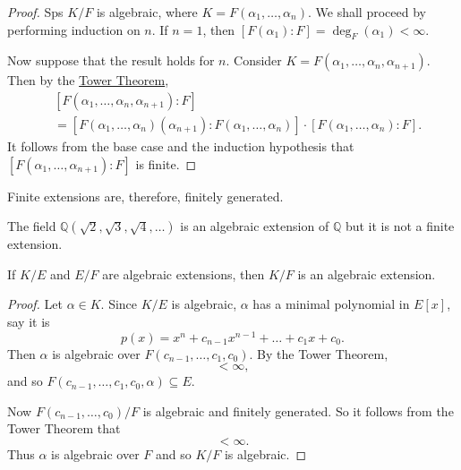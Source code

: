 \documentclass[notoc,notitlepage]{tufte-book}
\begin{document}
\begin{proof}
  Sps $K / F$ is algebraic, where $K = F(\alpha_1, \ldots, \alpha_n)$. We shall proceed by performing
  induction on $n$. If $n = 1$, then $[F(\alpha_1) : F] = \deg_F(\alpha_1) < \infty$.

  Now suppose that the result holds for $n$. Consider $K = F(\alpha_1, \ldots, \alpha_n, \alpha_{n + 1})$.
  Then by the \hyperref[thm:tower_theorem]{Tower Theorem},
  \begin{align*}
    &[F(\alpha_1, \ldots, \alpha_n, \alpha_{n + 1}) : F] \\
    &= [F(\alpha_1, \ldots, \alpha_{n})(\alpha_{n + 1}) : F(\alpha_1, \ldots, \alpha_n)]
        \cdot [F(\alpha_1, \ldots, \alpha_n) : F].
  \end{align*}
  It follows from the base case and the induction hypothesis that $[F(\alpha_1, \ldots, \alpha_{n +1}):F]$
  is finite.
\end{proof}

\begin{note}
  Finite extensions are, therefore, finitely generated.
\end{note}

\begin{eg}
  The field $\mathbb{Q}(\sqrt{2}, \sqrt{3}, \sqrt{4}, \ldots)$ is an algebraic extension of $\mathbb{Q}$
  but it is not a finite extension.
\end{eg}

\begin{propo}\label{propo:greater_algebraic_extensions}
  If $K / E$ and $E / F$ are algebraic extensions, then $K / F$ is an algebraic extension.
\end{propo}

\begin{proof}
  Let $\alpha \in K$. Since $K / E$ is algebraic, $\alpha$ has a minimal polynomial in $E[x]$, say it is
  \begin{equation*}
    p(x) = x^n + c_{n - 1} x^{n - 1} + \hdots + c_1 x + c_0.
  \end{equation*}
  Then $\alpha$ is algebraic over $F(c_{n - 1}, \ldots, c_1, c_0)$. By the Tower Theorem,
  \begin{equation*}
    [F(c_{n - 1}, \ldots, c_1, c_0, \alpha) : F(c_{n - 1}, \ldots, c_0)] < \infty,
  \end{equation*}
  and so $F(c_{n - 1}, \ldots, c_1, c_0, \alpha) \subseteq E$.
  
  Now $F(c_{n - 1}, \ldots, c_0) / F$ is algebraic and finitely generated. So it follows from the Tower
  Theorem that
  \begin{equation*}
    [F(c_{n - 1}, \ldots, c_0, \alpha) : F] < \infty.
  \end{equation*}
  Thus $\alpha$ is algebraic over $F$ and so $K / F$ is algebraic.
\end{proof}
\end{document}

